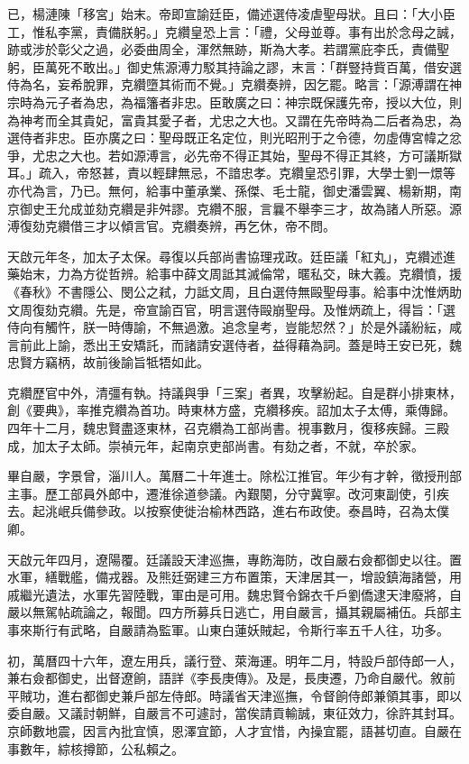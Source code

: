 \begin{pinyinscope}
已，楊漣陳「移宮」始末。帝即宣諭廷臣，備述選侍凌虐聖母狀。且曰：「大小臣工，惟私李黨，責備朕躬。」克纘皇恐上言：「禮，父母並尊。事有出於念母之誠，跡或涉於彰父之過，必委曲周全，渾然無跡，斯為大孝。若謂黨庇李氏，責備聖躬，臣萬死不敢出。」御史焦源溥力駁其持論之謬，末言：「群豎持貲百萬，借安選侍為名，妄希脫罪，克纘墮其術而不覺。」克纘奏辨，因乞罷。略言：「源溥謂在神宗時為元子者為忠，為福籓者非忠。臣敢廣之曰：神宗既保護先帝，授以大位，則為神考而全其貴妃，富貴其愛子者，尤忠之大也。又謂在先帝時為二后者為忠，為選侍者非忠。臣亦廣之曰：聖母既正名定位，則光昭刑于之令德，勿虛傳宮幃之忿爭，尤忠之大也。若如源溥言，必先帝不得正其始，聖母不得正其終，方可議斯獄耳。」疏入，帝怒甚，責以輕肆無忌，不諳忠孝。克纘皇恐引罪，大學士劉一燝等亦代為言，乃已。無何，給事中董承業、孫傑、毛士龍，御史潘雲翼、楊新期，南京御史王允成並劾克纘是非舛謬。克纘不服，言曩不舉李三才，故為諸人所惡。源溥復劾克纘借三才以傾言官。克纘奏辨，再乞休，帝不問。

天啟元年冬，加太子太保。尋復以兵部尚書協理戎政。廷臣議「紅丸」，克纘述進藥始末，力為方從哲辨。給事中薛文周詆其滅倫常，暱私交，昧大義。克纘憤，援《春秋》不書隱公、閔公之弒，力詆文周，且白選侍無毆聖母事。給事中沈惟炳助文周復劾克纘。先是，帝宣諭百官，明言選侍毆崩聖母。及惟炳疏上，得旨：「選侍向有觸忤，朕一時傳諭，不無過激。追念皇考，豈能恝然？」於是外議紛紜，咸言前此上諭，悉出王安矯託，而諸請安選侍者，益得藉為詞。蓋是時王安已死，魏忠賢方竊柄，故前後諭旨牴牾如此。

克纘歷官中外，清彊有執。持議與爭「三案」者異，攻擊紛起。自是群小排東林，創《要典》，率推克纘為首功。時東林方盛，克纘移疾。詔加太子太傅，乘傳歸。四年十二月，魏忠賢盡逐東林，召克纘為工部尚書。視事數月，復移疾歸。三殿成，加太子太師。崇禎元年，起南京吏部尚書。有劾之者，不就，卒於家。

畢自嚴，字景曾，淄川人。萬曆二十年進士。除松江推官。年少有才幹，徵授刑部主事。歷工部員外郎中，遷淮徐道參議。內艱闋，分守冀寧。改河東副使，引疾去。起洮岷兵備參政。以按察使徙治榆林西路，進右布政使。泰昌時，召為太僕卿。

天啟元年四月，遼陽覆。廷議設天津巡撫，專飭海防，改自嚴右僉都御史以往。置水軍，繕戰艦，備戎器。及熊廷弼建三方布置策，天津居其一，增設鎮海諸營，用戚繼光遺法，水軍先習陸戰，軍由是可用。魏忠賢令錦衣千戶劉僑逮天津廢將，自嚴以無駕帖疏論之，報聞。四方所募兵日逃亡，用自嚴言，攝其親屬補伍。兵部主事來斯行有武略，自嚴請為監軍。山東白蓮妖賊起，令斯行率五千人往，功多。

初，萬曆四十六年，遼左用兵，議行登、萊海運。明年二月，特設戶部侍郎一人，兼右僉都御史，出督遼餉，語詳《李長庚傳》。及是，長庚遷，乃命自嚴代。敘前平賊功，進右都御史兼戶部左侍郎。時議省天津巡撫，令督餉侍郎兼領其事，即以委自嚴。又議討朝鮮，自嚴言不可遽討，當俟請貢輸誠，東征效力，徐許其封耳。京師數地震，因言內批宜慎，恩澤宜節，人才宜惜，內操宜罷，語甚切直。自嚴在事數年，綜核撙節，公私賴之。


\end{pinyinscope}
